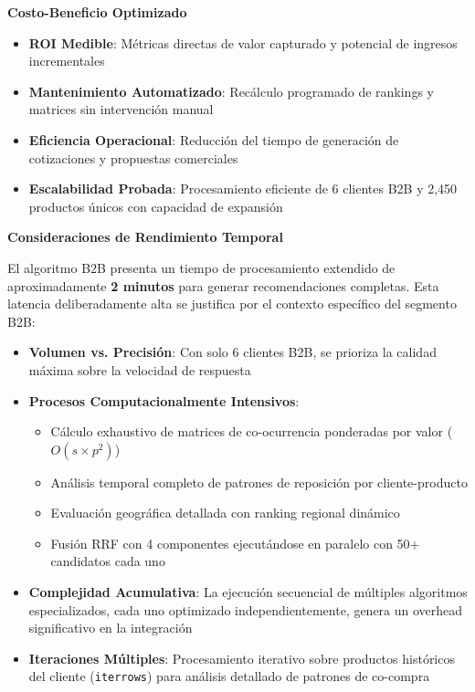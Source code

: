 \documentclass[twocolumn]{article}
\begin{document}
\textbf{Costo-Beneficio Optimizado}
\begin{itemize}
    \item \textbf{ROI Medible}: Métricas directas de valor capturado y potencial de ingresos incrementales
    \item \textbf{Mantenimiento Automatizado}: Recálculo programado de rankings y matrices sin intervención manual
    \item \textbf{Eficiencia Operacional}: Reducción del tiempo de generación de cotizaciones y propuestas comerciales
    \item \textbf{Escalabilidad Probada}: Procesamiento eficiente de 6 clientes B2B y 2,450 productos únicos con capacidad de expansión
\end{itemize}

\textbf{Consideraciones de Rendimiento Temporal}

El algoritmo B2B presenta un tiempo de procesamiento extendido de aproximadamente \textbf{2 minutos} para generar recomendaciones completas. Esta latencia deliberadamente alta se justifica por el contexto específico del segmento B2B:

\begin{itemize}
    \item \textbf{Volumen vs. Precisión}: Con solo 6 clientes B2B, se prioriza la calidad máxima sobre la velocidad de respuesta
    \item \textbf{Procesos Computacionalmente Intensivos}: 
    \begin{itemize}
        \item Cálculo exhaustivo de matrices de co-ocurrencia ponderadas por valor (\(O(s \times p^2)\))
        \item Análisis temporal completo de patrones de reposición por cliente-producto
        \item Evaluación geográfica detallada con ranking regional dinámico
        \item Fusión RRF con 4 componentes ejecutándose en paralelo con 50+ candidatos cada uno
    \end{itemize}
    \item \textbf{Complejidad Acumulativa}: La ejecución secuencial de múltiples algoritmos especializados, cada uno optimizado independientemente, genera un overhead significativo en la integración
    \item \textbf{Iteraciones Múltiples}: Procesamiento iterativo sobre productos históricos del cliente (\texttt{iterrows}) para análisis detallado de patrones de co-compra
\end{itemize}
\end{document}
